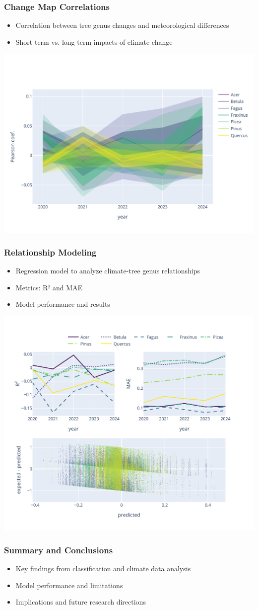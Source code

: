\documentclass[compress]{beamer}
\begin{document}
\begin{frame}
\frametitle{Change Map Correlations}
\begin{itemize}
    \item Correlation between tree genus changes and meteorological differences
    \item Short-term vs. long-term impacts of climate change
\end{itemize}
\includegraphics[width=0.9\linewidth]{../report/figures/figures_climate/genus_corr.pdf}
\end{frame}

\begin{frame}
\frametitle{Relationship Modeling}
\begin{itemize}
    \item Regression model to analyze climate-tree genus relationships
    \item Metrics: R² and MAE
    \item Model performance and results
\end{itemize}
\includegraphics[width=0.8\linewidth]{../report/figures/figures_climate/regression_results.png}
\end{frame}

\begin{frame}
\frametitle{Summary and Conclusions}
\begin{itemize}
    \item Key findings from classification and climate data analysis
    \item Model performance and limitations
    \item Implications and future research directions
\end{itemize}
\end{frame}
\end{document}
